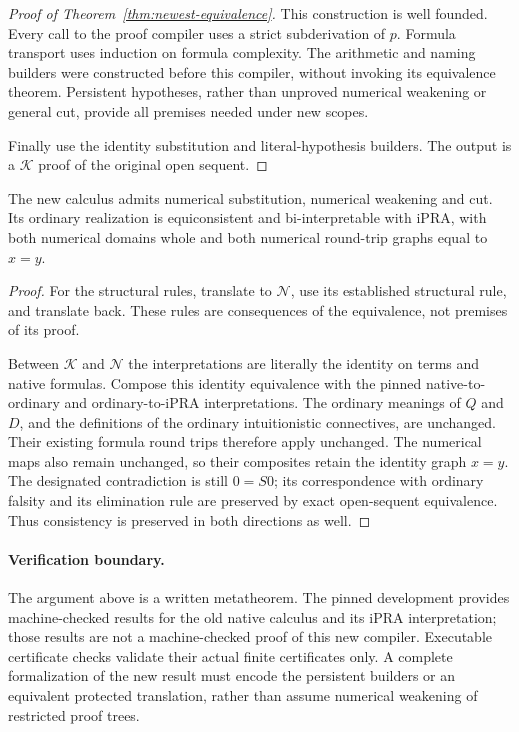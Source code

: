 \begin{proof}[Proof of Theorem~\ref{thm:newest-equivalence}]
This construction is well founded. Every call to the proof compiler
uses a strict subderivation of $p$. Formula transport uses induction
on formula complexity. The arithmetic and naming builders were
constructed before this compiler, without invoking its equivalence
theorem. Persistent hypotheses, rather than unproved numerical
weakening or general cut, provide all premises needed under new scopes.

Finally use the identity substitution and literal-hypothesis builders.
The output is a $\mathcal K$ proof of the original open sequent.
\end{proof}

\begin{corollary}
The new calculus admits numerical substitution, numerical weakening and
cut. Its ordinary realization is equiconsistent and bi-interpretable
with iPRA, with both numerical domains whole and both numerical
round-trip graphs equal to $x=y$.
\end{corollary}

\begin{proof}
For the structural rules, translate to $\mathcal N$, use its established
structural rule, and translate back. These rules are consequences of
the equivalence, not premises of its proof.

Between $\mathcal K$ and $\mathcal N$ the interpretations are literally
the identity on terms and native formulas. Compose this identity
equivalence with the pinned native-to-ordinary and ordinary-to-iPRA
interpretations. The ordinary meanings of $Q$ and $D$, and the definitions
of the ordinary intuitionistic connectives, are unchanged. Their existing
formula round trips therefore apply unchanged. The numerical maps also
remain unchanged, so their composites retain the identity graph $x=y$.
The designated contradiction is still $0=S0$; its correspondence with
ordinary falsity and its elimination rule are preserved by exact
open-sequent equivalence. Thus consistency is preserved in both
directions as well.
\end{proof}

\paragraph{Verification boundary.}
The argument above is a written metatheorem. The pinned development
provides machine-checked results for the old native calculus and its
iPRA interpretation; those results are not a machine-checked proof of
this new compiler. Executable certificate checks validate their actual
finite certificates only. A complete formalization of the new result
must encode the persistent builders or an equivalent protected
translation, rather than assume numerical weakening of restricted
proof trees.
